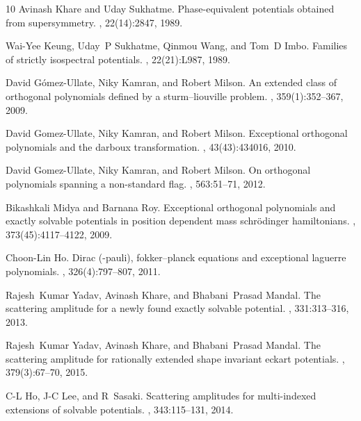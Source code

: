\documentclass[11pt]{article}
\begin{document}
\begin{thebibliography}{10}
Avinash Khare and Uday Sukhatme.
\newblock Phase-equivalent potentials obtained from supersymmetry.
, 22(14):2847,
  1989.

Wai-Yee Keung, Uday~P Sukhatme, Qinmou Wang, and Tom~D Imbo.
\newblock Families of strictly isospectral potentials.
, 22(21):L987,
  1989.

David G{\'o}mez-Ullate, Niky Kamran, and Robert Milson.
\newblock An extended class of orthogonal polynomials defined by a
  sturm--liouville problem.
,
  359(1):352--367, 2009.

David Gomez-Ullate, Niky Kamran, and Robert Milson.
\newblock Exceptional orthogonal polynomials and the darboux transformation.
,
  43(43):434016, 2010.

David Gomez-Ullate, Niky Kamran, and Robert Milson.
\newblock On orthogonal polynomials spanning a non-standard flag.
, 563:51--71, 2012.

Bikashkali Midya and Barnana Roy.
\newblock Exceptional orthogonal polynomials and exactly solvable potentials in
  position dependent mass schr{\"o}dinger hamiltonians.
, 373(45):4117--4122, 2009.

Choon-Lin Ho.
\newblock Dirac (-pauli), fokker--planck equations and exceptional laguerre
  polynomials.
, 326(4):797--807, 2011.

Rajesh~Kumar Yadav, Avinash Khare, and Bhabani~Prasad Mandal.
\newblock The scattering amplitude for a newly found exactly solvable
  potential.
, 331:313--316, 2013.

Rajesh~Kumar Yadav, Avinash Khare, and Bhabani~Prasad Mandal.
\newblock The scattering amplitude for rationally extended shape invariant
  eckart potentials.
, 379(3):67--70, 2015.

C-L Ho, J-C Lee, and R~Sasaki.
\newblock Scattering amplitudes for multi-indexed extensions of solvable
  potentials.
, 343:115--131, 2014.


\end{thebibliography}
\end{document}
